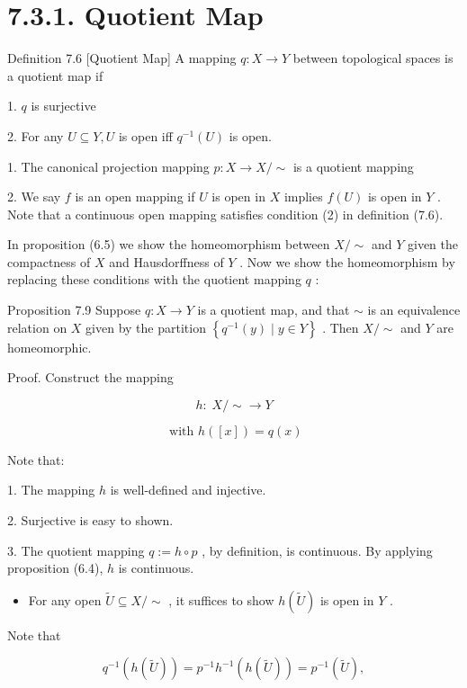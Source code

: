 \section*{7.3.1. Quotient Map}

Definition 7.6 [Quotient Map] A mapping \(q : X \rightarrow  Y\) between topological spaces is a quotient map if

1. \(q\) is surjective

2. For any \(U \subseteq  Y,U\) is open iff \({q}^{-1}\left( U\right)\) is open.

1. The canonical projection mapping \(p : X \rightarrow  X/ \sim\) is a quotient mapping

2. We say \(f\) is an open mapping if \(U\) is open in \(X\) implies \(f\left( U\right)\) is open in \(Y\) . Note that a continuous open mapping satisfies condition (2) in definition (7.6).

In proposition (6.5) we show the homeomorphism between \(X/ \sim\) and \(Y\) given the compactness of \(X\) and Hausdorffness of \(Y\) . Now we show the homeomorphism by replacing these conditions with the quotient mapping \(q\) :

Proposition 7.9 Suppose \(q : X \rightarrow  Y\) is a quotient map, and that \(\sim\) is an equivalence relation on \(X\) given by the partition \(\left\{  {{q}^{-1}\left( y\right)  \mid  y \in  Y}\right\}\) . Then \(X/ \sim\) and \(Y\) are homeomorphic.

Proof. Construct the mapping

\[
h : \;X/ \sim   \rightarrow  Y
\]

\[
\text{ with }h\left( \left\lbrack  x\right\rbrack  \right)  = q\left( x\right)
\]

Note that:

1. The mapping \(h\) is well-defined and injective.

2. Surjective is easy to shown.

3. The quotient mapping \(q \mathrel{\text{ := }} h \circ  p\) , by definition, is continuous. By applying proposition (6.4), \(h\) is continuous.

\begin{itemize}
\item For any open \(\widetilde{U} \subseteq  X/ \sim\) , it suffices to show \(h\left( \widetilde{U}\right)\) is open in \(Y\) .
\end{itemize}

Note that

\[
{q}^{-1}\left( {h\left( \widetilde{U}\right) }\right)  = {p}^{-1}{h}^{-1}\left( {h\left( \widetilde{U}\right) }\right)  = {p}^{-1}\left( \widetilde{U}\right) ,
\]

